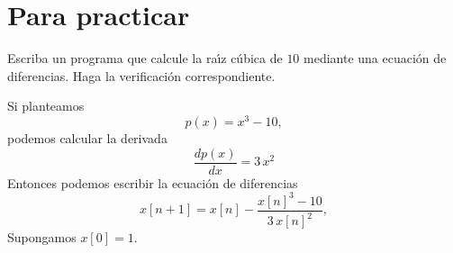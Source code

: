 \section{Para practicar}

Escriba un programa que calcule la ra\'{\i}z c\'{u}bica de $10$ mediante una ecuaci\'{o}n de diferencias. Haga la verificaci\'{o}n correspondiente.

Si planteamos
\begin{equation}
	p(x) = x^{3} - 10,
\end{equation}
podemos calcular la derivada
\begin{equation}
	\frac{dp(x)}{dx} = 3 \, x^{2}
\end{equation}
Entonces podemos escribir la ecuación de diferencias
\begin{equation}
	x[n+1] = x[n] - \frac{x[n]^{3} - 10}{3 \, x[n]^{2}},
\end{equation}
Supongamos $x[0] = 1$.


